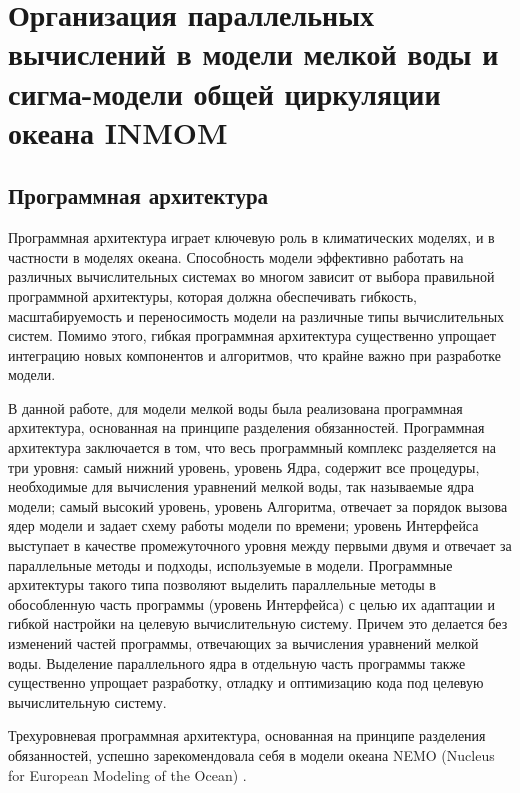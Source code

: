\chapter{Организация параллельных вычислений в модели мелкой воды и сигма-модели общей циркуляции океана INMOM}\label{ch:ch2}

\section{Программная архитектура}\label{sec:ch2/sec1}

Программная архитектура играет ключевую роль в климатических моделях, и в частности в моделях океана.
Способность модели эффективно работать на различных вычислительных системах во многом зависит от выбора правильной программной архитектуры, которая должна обеспечивать гибкость, масштабируемость и переносимость модели на различные типы вычислительных систем.
Помимо этого, гибкая программная архитектура существенно упрощает интеграцию новых компонентов и алгоритмов, что крайне важно при разработке модели.

В данной работе, для модели мелкой воды была реализована программная архитектура, основанная на принципе разделения обязанностей.
Программная архитектура заключается в том, что весь программный комплекс разделяется на три уровня: самый нижний уровень, уровень Ядра, содержит все процедуры, необходимые для вычисления уравнений мелкой воды, так называемые ядра модели; самый высокий уровень, уровень Алгоритма, отвечает за порядок вызова ядер модели и задает схему работы модели по времени; уровень Интерфейса выступает в качестве промежуточного уровня между первыми двумя и отвечает за параллельные методы и подходы, используемые в модели. 
Программные архитектуры такого типа позволяют выделить параллельные методы в обособленную часть программы (уровень Интерфейса) с целью их адаптации и гибкой настройки на целевую вычислительную систему. Причем это делается без изменений частей программы, отвечающих за вычисления уравнений мелкой воды.
Выделение параллельного ядра в отдельную часть программы также существенно упрощает разработку, отладку и оптимизацию кода под целевую вычислительную систему.

Трехуровневая программная архитектура, основанная на принципе разделения обязанностей, успешно зарекомендовала себя в модели океана NEMO (Nucleus for European Modeling of the Ocean) \cite{gmd-11-3447-2018}. 

